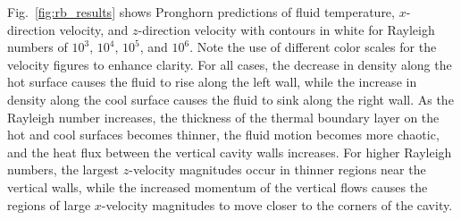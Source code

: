 Fig.\ \ref{fig:rb_results} shows Pronghorn predictions of fluid temperature, \(x\)-direction velocity, and \(z\)-direction velocity with contours in white for Rayleigh numbers of \(10^3\), \(10^4\), \(10^5\), and \(10^6\). Note the use of different color scales for the velocity figures to enhance clarity. For all cases, the decrease in density along the hot surface causes the fluid to rise along the left wall, while the increase in density along the cool surface causes the fluid to sink along the right wall. As the Rayleigh number increases, the thickness of the thermal boundary layer on the hot and cool surfaces becomes thinner, the fluid motion becomes more chaotic, and the heat flux between the vertical cavity walls increases. For higher Rayleigh numbers, the largest \(z\)-velocity magnitudes occur in thinner regions near the vertical walls, while the increased momentum of the vertical flows causes the regions of large \(x\)-velocity magnitudes to move closer to the corners of the cavity.

